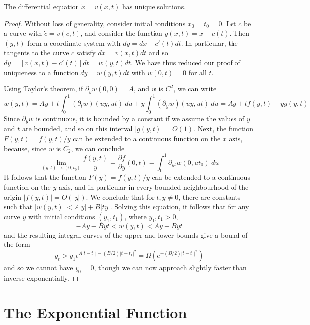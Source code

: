 \begin{theorem}
    The differential equation $\dot{x} = v(x,t)$ has unique solutions.
\end{theorem}
\begin{proof}
    Without loss of generality, consider initial conditions $x_0 = t_0 = 0$. Let $c$ be a curve with $\dot{c} = v(c,t)$, and consider the function $y(x,t) = x - c(t)$. Then $(y,t)$ form a coordinate system with $dy = dx - c'(t)dt$. In particular, the tangents to the curve $c$ satisfy $dx = v(x,t)dt$ and so $dy = [v(x,t) - c'(t)]dt = w(y,t)dt$. We have thus reduced our proof of uniqueness to a function $dy = w(y,t)dt$ with $w(0,t) = 0$ for all $t$.

    Using Taylor's theorem, if $\partial_y w(0,0) = A$, and $w$ is $C^2$, we can write
    \[ w(y,t) = Ay + t \int_0^1 (\partial_t w)(uy,ut)\ du + y \int_0^1 (\partial_y w)(uy,ut)\ du = Ay + tf(y,t) + yg(y,t) \]
    Since $\partial_y w$ is continuous, it is bounded by a constant if we assume the values of $y$ and $t$ are bounded, and so on this interval $|g(y,t)| = O(1)$. Next, the function $F(y,t) = f(y,t)/y$ can be extended to a continuous function on the $x$ axis, because, since $w$ is $C_2$, we can conclude
    \[ \lim_{(y,t) \to (0,t_0)} \frac{f(y,t)}{y} = \frac{\partial f}{\partial y}(0,t) = \int_0^1 \partial_{yt} w(0,ut_0)\ du \]
    It follows that the function $F(y) = f(y,t)/y$ can be extended to a continuous function on the $y$ axis, and in particular in every bounded neighbourhood of the origin $|f(y,t)| = O(|y|)$. We conclude that for $t,y \neq 0$, there are constants such that $|w(y,t)| < A|y| + B|ty|$. Solving this equation, it follows that for any curve $y$ with initial conditions $(y_1,t_1)$, where $y_1, t_1 > 0$,
    \[ -Ay - Byt < w(y,t) < Ay + Byt \]
    and the resulting integral curves of the upper and lower bounds give a bound of the form
    \[ y_t > y_1e^{A|t - t_1| -(B/2)|t-t_1|^2} = \Omega(e^{-(B/2)|t-t_1|^2}) \]
    and so we cannot have $y_0 = 0$, though we can now approach slightly faster than inverse exponentially.
\end{proof}

\chapter{The Exponential Function}


